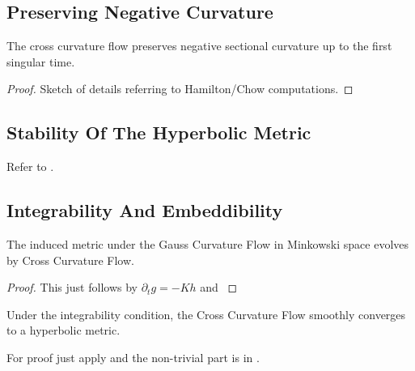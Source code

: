 \documentclass[a4paper, 12pt]{amsart}
\begin{document}
\subsection{Preserving Negative Curvature}
\label{subsec:xcf_preserving}
\begin{lemma}
The cross curvature flow preserves negative sectional curvature up to the first singular time.
\end{lemma}
\begin{proof}
{\color{red} Sketch of details referring to Hamilton/Chow computations.}
\end{proof}
\subsection{Stability Of The Hyperbolic Metric}
\label{subsec:xcf_stability}

{\color{red} Refer to \cite{MR2448593}.}

\subsection{Integrability And Embeddibility}
\label{subsec:xcf_gcf}
\begin{lemma}
\label{lem:xcf_gcf}
The induced metric under the Gauss Curvature Flow in Minkowski space evolves by Cross Curvature Flow.
\end{lemma}
\begin{proof}
{\color{red} This just follows by \(\partial_t g = -K h\) and }
\end{proof}
\begin{thm}
\label{thm:xcf_integrable_convergence}
Under the integrability condition, the Cross Curvature Flow smoothly converges to a hyperbolic metric.
\end{thm}

{\color{red}For proof just apply  and the non-trivial part is in \cite{MR3344442}.}
\end{document}

